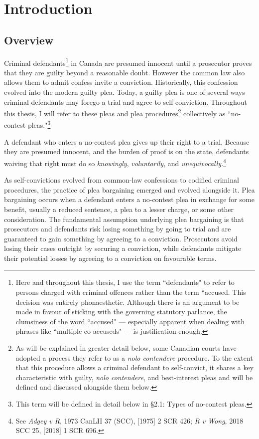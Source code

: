 \chapter{Introduction}

\section{Overview}

Criminal defendants\footnote{Here and throughout this thesis, I use the term ``defendants" to refer to persons charged with criminal offences rather than the term ``accused. This decision was entirely phonaesthetic. Although there is an argument to be made in favour of sticking with the governing statutory parlance, the clumsiness of the word ``accused" — especially apparent when dealing with phrases like ``multiple co-accuseds" — is justification enough.} in Canada are presumed innocent until a prosecutor proves that they are guilty beyond a reasonable doubt. However the common law also allows them to admit confess invite a conviction. Historically, this confession evolved into the modern guilty plea. Today, a guilty plea is one of several ways criminal defendants may forego a trial and agree to self-conviction. Throughout this thesis, I will refer to these pleas and plea procedures\footnote{As will be explained in greater detail below, some Canadian courts have adopted a process they refer to as a \textit{nolo contendere} procedure. To the extent that this procedure allows a criminal defendant to self-convict, it shares a key characteristic with guilty, \textit{nolo contendere}, and best-interest pleas and will be defined and discussed alongside them below.} collectively as ``no-contest pleas."\footnote{This term will be defined in detail below in §2.1: Types of no-contest pleas.} 

A defendant who enters a no-contest plea gives up their right to a trial. Because they are presumed innocent, and the burden of proof is on the state, defendants waiving that right must do so \textit{knowingly}, \textit{voluntarily}, and \textit{unequivocally}.\footnote{See \textit{Adgey v R}, 1973 CanLII 37 (SCC), [1975] 2 SCR 426; \textit{R v Wong}, 2018 SCC 25, [2018] 1 SCR 696.}

As self-convictions evolved from common-law confessions to codified criminal procedures, the practice of plea bargaining emerged and evolved alongside it. Plea bargaining occurs when a defendant enters a no-contest plea in exchange for some benefit, usually a reduced sentence, a plea to a lesser charge, or some other consideration. The fundamental assumption underlying plea bargaining is that prosecutors and defendants risk losing something by going to trial and are guaranteed to gain something by agreeing to a conviction. Prosecutors avoid losing their cases outright by securing a conviction, while defendants mitigate their potential losses by agreeing to a conviction on favourable terms.

